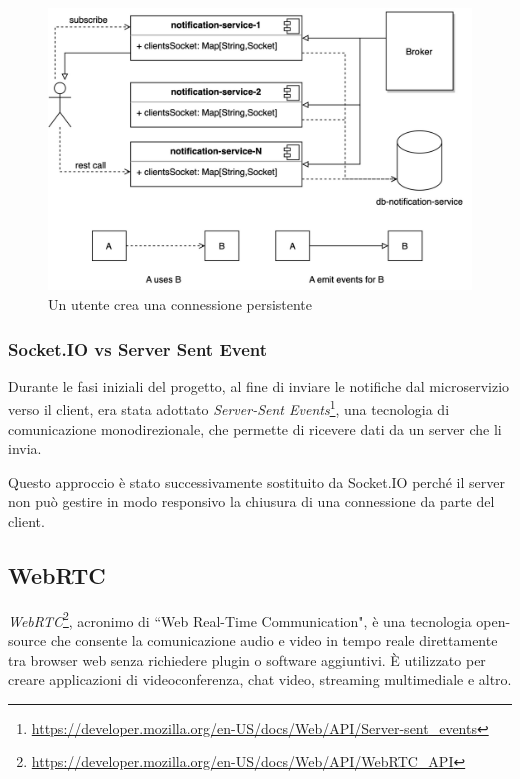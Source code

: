 \begin{figure}[H]
    \centering
    \includegraphics[width=\textwidth]{sections/04-implementation/img/notification-replication.jpg}
    \caption{Un utente crea una connessione persistente}
\end{figure}

%
%
%
\subsubsection{Socket.IO vs Server Sent Event}

Durante le fasi iniziali del progetto, al fine di inviare le notifiche dal microservizio verso il client, era stata adottato \emph{Server-Sent Events}\footnote{\url{https://developer.mozilla.org/en-US/docs/Web/API/Server-sent_events}}, una tecnologia di comunicazione monodirezionale, che permette di ricevere dati da un server che li invia.

Questo approccio è stato successivamente sostituito da Socket.IO perché il server non può gestire in modo responsivo la chiusura di una connessione da parte del client.

%
%
%
\subsection{WebRTC}

\emph{WebRTC}\footnote{\url{https://developer.mozilla.org/en-US/docs/Web/API/WebRTC_API}}, acronimo di “Web Real-Time Communication", è una tecnologia open-source che consente la comunicazione audio e video in tempo reale direttamente tra browser web senza richiedere plugin o software aggiuntivi.
%
È utilizzato per creare applicazioni di videoconferenza, chat video, streaming multimediale e altro.


